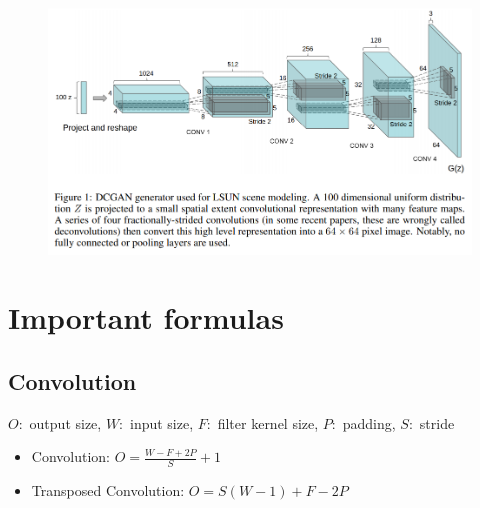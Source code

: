\documentclass{scrartcl}
\begin{document}
\begin{figure}
	\centering
		\includegraphics[scale=0.5]{img/dcgan_arch}
	\caption{}
	\label{fig:dcgan_arch}
\end{figure}

\section{Important formulas}
\subsection{Convolution}
$O:$ output size, $W:$ input size, $F:$ filter kernel size, $P:$ padding, $S:$ stride
\begin{itemize}
	\item
		Convolution: $O = \frac{W - F + 2P}{S} + 1$
	\item
		Transposed Convolution: $O = S(W-1) + F - 2P$
\end{itemize}

\newpage


\end{document}
